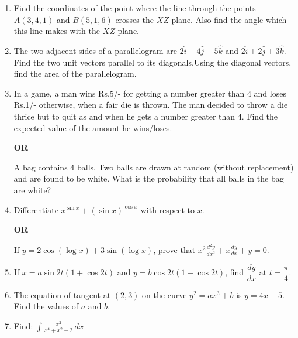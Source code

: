 \documentclass[a4paper,12pt]{article}
\begin{document}
\begin{enumerate}[label=\textbf{\arabic*.}]
\begin{center}
	\section*{\large \textbf{SECTION-B}}
	\textbf{Questions numbers $7$-$19$ carry 4 marks each}
\end{center}
	\vspace{1em}
	\item Find the coordinates of the point where the line through the points $A(3, 4, 1)$ and $B(5, 1, 6)$ crosses the $XZ$ plane. Also find the angle which this line makes with the $XZ$ plane.
	\vspace{0.5em}
	\item The two adjacent sides of a parallelogram are $2\hat{i} - 4\hat{j} - 5\hat{k}$ and $2\hat{i} + 2\hat{j} + 3\hat{k}$. Find the two unit vectors parallel to its diagonals.Using the diagonal vectors, find the area of the parallelogram.
	\vspace{0.5em}
	\item In a game, a man wins Rs.5/- for getting a number greater than 4 and loses Rs.1/- otherwise, when a fair die is thrown. The man decided to throw a die thrice but to quit as and when he gets a number greater than 4. Find the expected value of the amount he wins/loses.\\
\begin{center}
    \textbf{OR} \\
\end{center}
A bag contains 4 balls. Two balls are drawn at random (without replacement) and are found to be white. What is the probability that all balls in the bag are white?
	\vspace{0.5em}
	\item Differentiate $x^{\sin x} + (\sin x)^{\cos x}$ with respect to $x$.
\begin{center}
\textbf{OR}
\end{center}
If $y = 2 \cos(\log x) + 3 \sin(\log x)$, prove that $x^2 \frac{d^2 y}{dx^2} + x \frac{dy}{dx} + y = 0.$
	\vspace{0.5em}
	\item If $x = a \sin 2t(1 + \cos 2t)$ and $y = b \cos 2t(1 - \cos 2t)$,  find $\dfrac{dy}{dx}$ at $t = \dfrac{\pi}{4}$.
	\vspace{0.5em}
	\item The equation of tangent at $(2, 3)$ on the curve $y^2 = ax^3 + b$ is $y = 4x - 5$. Find the values of $a$ and $b$.
	\vspace{0.5em}
	\item Find: $\int \frac{x^2}{x^4 + x^2 - 2} \, dx$
\end{enumerate}
\end{document}
